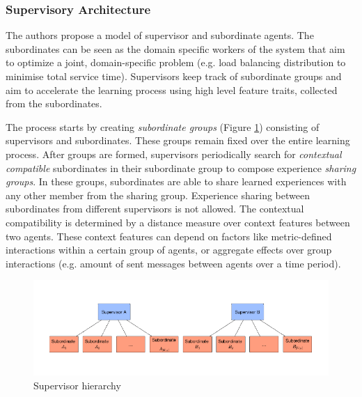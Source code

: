 \documentclass[letterpaper]{article}
\begin{document}
\subsubsection{Supervisory Architecture}
The authors propose a model of supervisor and subordinate agents. The subordinates can be seen as the domain specific workers of the system that aim to optimize a joint, domain-specific problem (e.g. load balancing distribution to minimise total service time). Supervisors keep track of subordinate groups and aim to accelerate the learning process using high level feature traits, collected from the subordinates.

The process starts by creating \textit{subordinate groups} (Figure \ref{fig:subordinate}) consisting of supervisors and subordinates. These groups remain fixed over the entire learning process. After groups are formed, supervisors periodically search for \textit{contextual compatible} subordinates in their subordinate group to compose experience \textit{sharing groups}. In these groups, subordinates are able to share learned experiences with any other member from the sharing group. Experience sharing between subordinates from different supervisors is not allowed. The contextual compatibility is determined by a distance measure over context features between two agents. These context features can depend on factors like metric-defined interactions within a certain group of agents, or aggregate effects over group interactions (e.g. amount of sent messages between agents over a time period).
\begin{figure}[H]
 \begin{center}
  \includegraphics[width=\linewidth]{figures/subordinates}
  \caption{Supervisor hierarchy \citep{garant2015accelerating}}
  \label{fig:subordinate}
 \end{center}
\end{figure}
\end{document}
